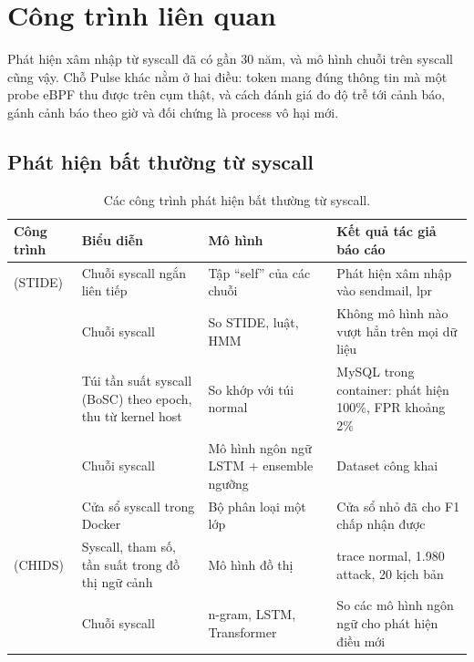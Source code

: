 \chapter{Công trình liên quan}

Phát hiện xâm nhập từ syscall đã có gần 30 năm, và mô hình chuỗi trên syscall cũng vậy. Chỗ Pulse khác nằm ở hai điều: token mang đúng thông tin mà một probe eBPF thu được trên cụm thật, và cách đánh giá đo độ trễ tới cảnh báo, gánh cảnh báo theo giờ và đối chứng là process vô hại mới.

\section{Phát hiện bất thường từ syscall}

\begin{longtable}[]{@{}>{\raggedright\arraybackslash}p{}>{\raggedright\arraybackslash}p{}>{\raggedright\arraybackslash}p{}>{\raggedright\arraybackslash}p{}@{}}
\caption{Các công trình phát hiện bất thường từ syscall.}\label{tab:related}\\
\toprule\noalign{}
Công trình & Biểu diễn & Mô hình & Kết quả tác giả báo cáo \\
\midrule\noalign{}
\endhead
\bottomrule\noalign{}
\endlastfoot
\citealp{forrest1996} (STIDE) & Chuỗi syscall ngắn liên tiếp & Tập ``self'' của các chuỗi & Phát hiện xâm nhập vào sendmail, lpr \\
\citealp{warrender1999} & Chuỗi syscall & So STIDE, luật, HMM & Không mô hình nào vượt hẳn trên mọi dữ liệu \\
\citealp{abed2016} & Túi tần suất syscall (BoSC) theo epoch, thu từ kernel host & So khớp với túi normal & MySQL trong container: phát hiện 100\%, FPR khoảng 2\% \\
\citealp{kim2016} & Chuỗi syscall & Mô hình ngôn ngữ LSTM + ensemble ngưỡng & Dataset công khai \\
\citealp{castanhel2020} & Cửa sổ syscall trong Docker & Bộ phân loại một lớp & Cửa sổ nhỏ đã cho F1 chấp nhận được \\
\citealp{elkhairi2022} (CHIDS) & Syscall, tham số, tần suất trong đồ thị ngữ cảnh & Mô hình đồ thị & 11.700 trace normal, 1.980 attack, 20 kịch bản \\
\citealp{fournier2023} & Chuỗi syscall & n-gram, LSTM, Transformer & So các mô hình ngôn ngữ cho phát hiện điều mới \\

\end{longtable}
